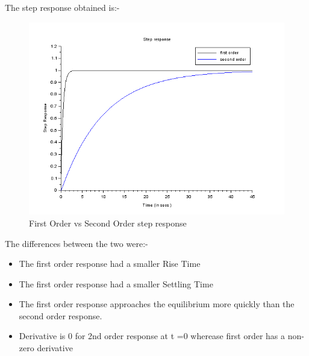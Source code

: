\documentclass[12pt]{article}
\begin{document}
    The step response obtained is:-
    \begin{figure}[H]
        \centering
        \includegraphics[scale=0.8]{q3_1.png}
        \caption{First Order vs Second Order step response}
        \label{fig:my_label}
    \end{figure}
    The differences between the two were:-
    \begin{itemize}
        \item The first order response had a smaller Rise Time \vspace{-2.5pt}
        \item The first order response had a smaller Settling Time
	\item The first order response approaches the equilibrium more quickly than the second order response.
\item Derivative is 0 for 2nd order response at t =0 wherease first order has a non-zero derivative
    \end{itemize}
\end{document}
